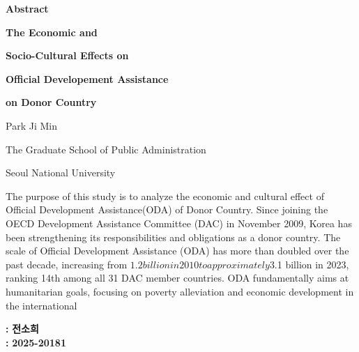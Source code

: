 
\begin{center}
  \begin{spacing}{3} %

    {\LARGE \bfseries Abstract} \par
    {\Huge \bfseries The Economic and} \par
    {\Huge \bfseries Socio-Cultural Effects on} \par
    {\Huge \bfseries Official Developement Assistance} \par
    {\Huge \bfseries on Donor Country} \par

  \end{spacing}
\end{center}

\begin{flushright}
    \begin{spacing}{2}
        {\Large Park Ji Min} \par
        {\Large The Graduate School of Public Administration} \par
        {\Large Seoul National University} \par
     \end{spacing}
\end{flushright}



The purpose of this study is to analyze the economic and cultural
effect of Official Development Assistance(ODA) of Donor Country.
Since joining the OECD Development Assistance Committee (DAC) in
November 2009, Korea has been strengthening its responsibilities and
obligations as a donor country. The scale of Official Development
Assistance (ODA) has more than doubled over the past decade,
increasing from $1.2 billion in 2010 to approximately $3.1 billion in
2023, ranking 14th among all 31 DAC member countries.
ODA fundamentally aims at humanitarian goals, focusing on
poverty alleviation and economic development in the international

\noindent
{}
\textbf{:}
\textbf{전소희}\\
\textbf{:}
\textbf{2025-20181}\\
